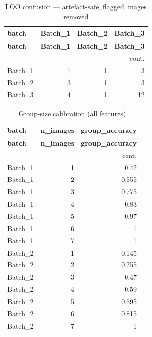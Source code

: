 \documentclass[11pt,a4paper]{article}
\begin{document}
\normalsize
\scriptsize
\begin{longtable}{lrrr}
\caption{LOO confusion --- artefact-safe, flagged images removed}\label{tab:confsafe_noflag}\\
\toprule
\textbf{batch} & \textbf{Batch\_1} & \textbf{Batch\_2} & \textbf{Batch\_3} \\
\midrule
\endfirsthead
\toprule \textbf{batch} & \textbf{Batch\_1} & \textbf{Batch\_2} & \textbf{Batch\_3} \\
\midrule
\endhead
\midrule\multicolumn{4}{r}{\footnotesize cont.}\\\midrule\endfoot
\bottomrule\endlastfoot
Batch\_1 & 1 & 1 & 3 \\
Batch\_2 & 3 & 1 & 3 \\
Batch\_3 & 4 & 1 & 12 \\
\end{longtable}
\normalsize
\scriptsize
\begin{longtable}{lrr}
\caption{Group-size calibration (all features)}\label{tab:need}\\
\toprule
\textbf{batch} & \textbf{n\_images} & \textbf{group\_accuracy} \\
\midrule
\endfirsthead
\toprule \textbf{batch} & \textbf{n\_images} & \textbf{group\_accuracy} \\
\midrule
\endhead
\midrule\multicolumn{3}{r}{\footnotesize cont.}\\\midrule\endfoot
\bottomrule\endlastfoot
Batch\_1 & 1 & 0.42 \\
Batch\_1 & 2 & 0.555 \\
Batch\_1 & 3 & 0.775 \\
Batch\_1 & 4 & 0.83 \\
Batch\_1 & 5 & 0.97 \\
Batch\_1 & 6 & 1 \\
Batch\_1 & 7 & 1 \\
Batch\_2 & 1 & 0.145 \\
Batch\_2 & 2 & 0.255 \\
Batch\_2 & 3 & 0.47 \\
Batch\_2 & 4 & 0.59 \\
Batch\_2 & 5 & 0.695 \\
Batch\_2 & 6 & 0.815 \\
Batch\_2 & 7 & 1 \\
\end{longtable}
\normalsize\scriptsize
\end{document}
